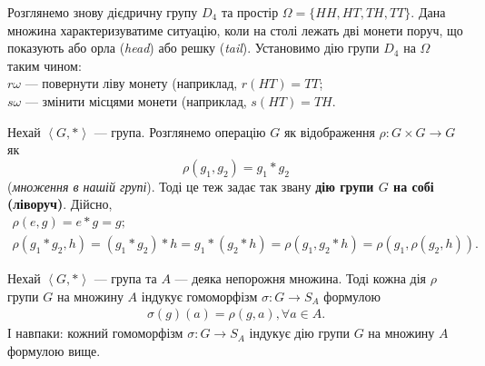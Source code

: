 \documentclass{math_library}
\begin{document}
\begin{example}
Розглянемо знову дієдричну групу $D_4$ та простір $\Omega = \{ HH, HT, TH, TT \}$. Дана множина характеризуватиме ситуацію, коли на столі лежать дві монети поруч, що показують або орла (\textit{head}) або решку (\textit{tail}). Установимо дію групи $D_4$ на $\Omega$ таким чином:\\
$r \omega$ --- повернути ліву монету (наприклад, $r (HT) = TT$;\\
$s \omega$ --- змінити місцями монети (наприклад, $s(HT) = TH$.
\end{example}

\begin{example}
Нехай $\left< G,*\right>$ --- група. Розглянемо операцію $G$ як відображення $\rho \colon G \times G \to G$ як
\[ 
\rho(g_1,g_2) = g_1*g_2
\]
(\textit{множення в нашій групі}). Тоді це теж задає так звану \textbf{дію групи $G$ на собі (ліворуч)}. Дійсно,
\begin{align*}
\rho(e,g) = e*g = g; \\
\rho(g_1*g_2,h) = (g_1*g_2)*h = g_1*(g_2*h) = \rho(g_1,g_2*h) = \rho(g_1,\rho(g_2,h)).
\end{align*}
\end{example}

\begin{proposition}
Нехай $\left< G,*\right>$ --- група та $A$ --- деяка непорожня множина. Тоді кожна дія $\rho$ групи $G$ на множину $A$ індукує гомоморфізм $\sigma \colon G \to S_A$ формулою
\begin{align*}
\sigma (g)(a) = \rho(g,a), \forall a \in A.
\end{align*}
І навпаки: кожний гомоморфізм $\sigma \colon G \to S_A$ індукує дію групи $G$ на множину $A$ формулою вище.
\end{proposition}
\end{document}
